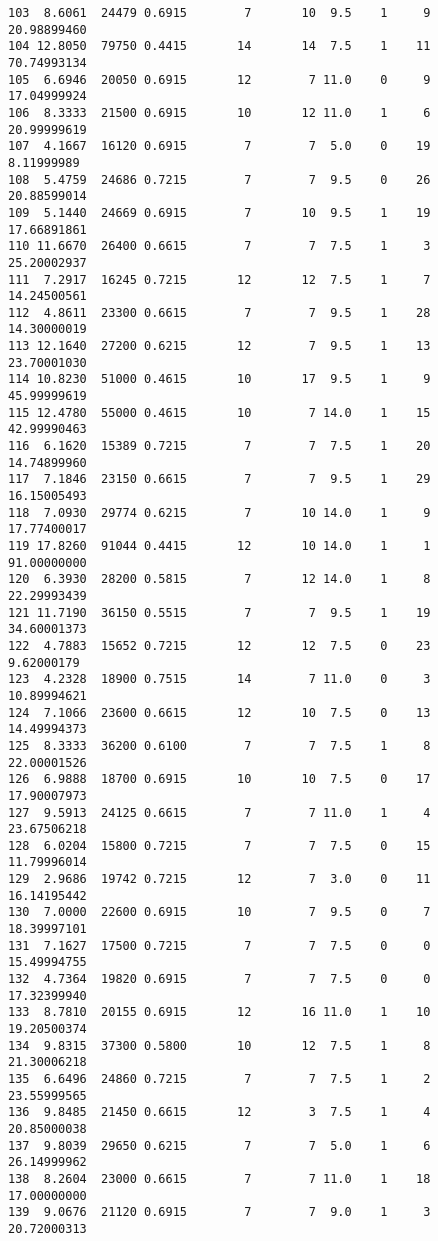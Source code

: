 \documentclass[
  letterpaper,
  DIV=11,
  numbers=noendperiod]{scrreprt}
\begin{document}
\begin{verbatim}
103  8.6061  24479 0.6915        7       10  9.5    1     9 20.98899460
104 12.8050  79750 0.4415       14       14  7.5    1    11 70.74993134
105  6.6946  20050 0.6915       12        7 11.0    0     9 17.04999924
106  8.3333  21500 0.6915       10       12 11.0    1     6 20.99999619
107  4.1667  16120 0.6915        7        7  5.0    0    19  8.11999989
108  5.4759  24686 0.7215        7        7  9.5    0    26 20.88599014
109  5.1440  24669 0.6915        7       10  9.5    1    19 17.66891861
110 11.6670  26400 0.6615        7        7  7.5    1     3 25.20002937
111  7.2917  16245 0.7215       12       12  7.5    1     7 14.24500561
112  4.8611  23300 0.6615        7        7  9.5    1    28 14.30000019
113 12.1640  27200 0.6215       12        7  9.5    1    13 23.70001030
114 10.8230  51000 0.4615       10       17  9.5    1     9 45.99999619
115 12.4780  55000 0.4615       10        7 14.0    1    15 42.99990463
116  6.1620  15389 0.7215        7        7  7.5    1    20 14.74899960
117  7.1846  23150 0.6615        7        7  9.5    1    29 16.15005493
118  7.0930  29774 0.6215        7       10 14.0    1     9 17.77400017
119 17.8260  91044 0.4415       12       10 14.0    1     1 91.00000000
120  6.3930  28200 0.5815        7       12 14.0    1     8 22.29993439
121 11.7190  36150 0.5515        7        7  9.5    1    19 34.60001373
122  4.7883  15652 0.7215       12       12  7.5    0    23  9.62000179
123  4.2328  18900 0.7515       14        7 11.0    0     3 10.89994621
124  7.1066  23600 0.6615       12       10  7.5    0    13 14.49994373
125  8.3333  36200 0.6100        7        7  7.5    1     8 22.00001526
126  6.9888  18700 0.6915       10       10  7.5    0    17 17.90007973
127  9.5913  24125 0.6615        7        7 11.0    1     4 23.67506218
128  6.0204  15800 0.7215        7        7  7.5    0    15 11.79996014
129  2.9686  19742 0.7215       12        7  3.0    0    11 16.14195442
130  7.0000  22600 0.6915       10        7  9.5    0     7 18.39997101
131  7.1627  17500 0.7215        7        7  7.5    0     0 15.49994755
132  4.7364  19820 0.6915        7        7  7.5    0     0 17.32399940
133  8.7810  20155 0.6915       12       16 11.0    1    10 19.20500374
134  9.8315  37300 0.5800       10       12  7.5    1     8 21.30006218
135  6.6496  24860 0.7215        7        7  7.5    1     2 23.55999565
136  9.8485  21450 0.6615       12        3  7.5    1     4 20.85000038
137  9.8039  29650 0.6215        7        7  5.0    1     6 26.14999962
138  8.2604  23000 0.6615        7        7 11.0    1    18 17.00000000
139  9.0676  21120 0.6915        7        7  9.0    1     3 20.72000313

\end{verbatim}
\end{document}
